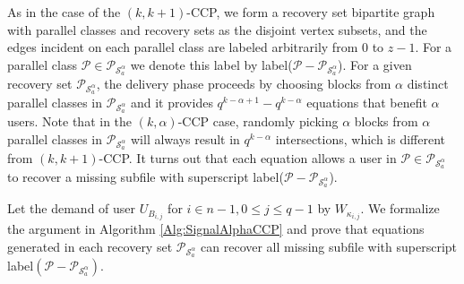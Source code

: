 \documentclass[journal,twocolumn]{IEEEtran}
\theoremstyle{definition}
\newcommand{\calP}{\mathcal{P}}
\newcommand{\calS}{\mathcal{S}}
\begin{document}
As in the case of the $(k,k+1)$-CCP, we form a recovery set bipartite graph with parallel classes and recovery sets as the disjoint vertex subsets, and the edges incident on each parallel class are labeled arbitrarily from $0$ to $z-1$. For a parallel class $\calP\in \calP_{\calS^{\alpha}_a}$ we denote this label by label($\calP-\calP_{\calS^{\alpha}_a}$). For a given recovery set $\calP_{\calS^{\alpha}_a}$, the delivery phase proceeds by choosing blocks from $\alpha$ distinct parallel classes in $\calP_{\calS^{\alpha}_a}$ and it provides $q^{k-\alpha+1}-q^{k-\alpha}$ equations that benefit $\alpha$ users. Note that in the $(k,\alpha)$-CCP case, randomly picking $\alpha$ blocks from $\alpha$ parallel classes in $\calP_{\calS^{\alpha}_a}$ will always result in $q^{k-\alpha}$ intersections, which is different from $(k,k+1)$-CCP. It turns out that each equation allows a user in $\calP\in \calP_{\calS^{\alpha}_a}$ to recover a missing subfile with superscript label($\calP-\calP_{\calS_{a}^\alpha}$).

Let the demand of user $U_{B_{i,j}}$ for $i\in n-1, 0\le j\le q-1$ by $W_{\kappa_{i,j}}$. We formalize the argument in Algorithm \ref{Alg:SignalAlphaCCP} and prove that equations generated in each recovery set $\calP_{\calS^{\alpha}_a}$ can recover all missing subfile with superscript label$(\calP-\calP_{\calS^{\alpha}_a})$.
\end{document}
